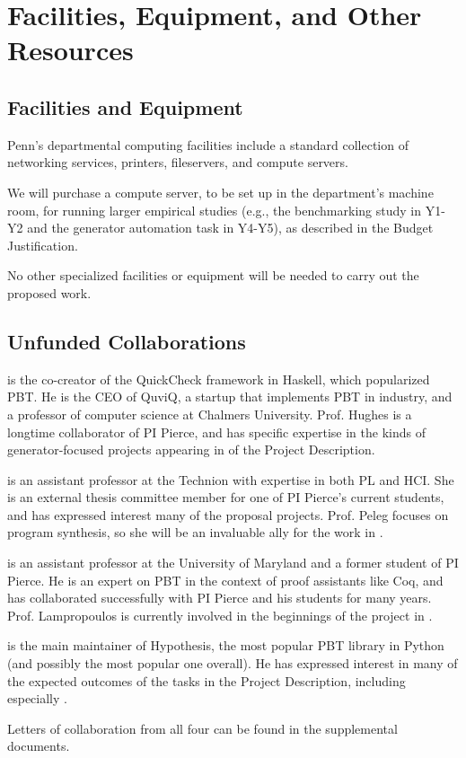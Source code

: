 \section*{Facilities, Equipment, and Other Resources}

\subsection*{Facilities and Equipment}

Penn's departmental computing facilities include a standard collection of
networking services, printers, fileservers, and compute servers.

We will purchase a compute server, to be set up in the department’s
machine room, for running larger empirical studies (e.g., the
benchmarking study in Y1-Y2 and the generator automation task in
Y4-Y5), as described in the Budget Justification.

No other specialized facilities or equipment will be needed to carry
out the proposed work.

\subsection*{Unfunded Collaborations}


 is the co-creator of the QuickCheck framework in
Haskell, which popularized PBT. He is the CEO of QuviQ, a startup that
implements PBT in industry, and a professor of computer science at Chalmers
University.  Prof. Hughes is a longtime collaborator of PI
Pierce, and has specific expertise in the kinds of generator-focused projects
appearing in  of the Project Description.

\smallskip{} is an assistant professor at the Technion with expertise in both
PL and HCI. She is an external thesis committee member for one of PI Pierce's current
students, and has expressed interest many of the proposal projects. Prof. Peleg
focuses on program synthesis, so she will be an invaluable ally for the work in
.

\smallskip{} is an assistant professor at the
University of Maryland and a former student of PI Pierce.  He is an expert on
PBT in the context of proof assistants like Coq, and has collaborated
successfully with PI Pierce and his students for many years. Prof. Lampropoulos
is currently involved in the beginnings of the project in
.

\smallskip{} is the main maintainer of
Hypothesis, the most popular PBT library in Python (and possibly the most
popular one overall). He has expressed interest in many of the expected outcomes
of the tasks in the Project Description, including especially
.

\smallskip

\noindent Letters of collaboration from all four can be found in the supplemental
documents.

